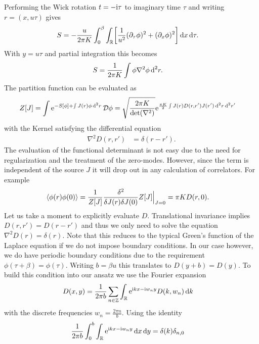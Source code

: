 \documentclass[english, parskip=full]{scrartcl}
\begin{document}
Performing the Wick rotation $t=-\i\tau$ to imaginary time $\tau$ and writing $r=(x,u\tau)$ gives
\begin{align}
S &= -\frac{u}{2\pi K} \intx{0}{\beta}{\intr{\klb*{\frac{1}{u^2} (\partial_\tau\phi)^2 + (\partial_x\phi)^2 }}{x} }{\tau}.
\end{align}
With $y=u\tau$ and partial integration this becomes
\begin{align}
S &= \frac{1}{2\pi K} \int \phi \nabla^2 \phi\,\d^2r.
\end{align}
The partition function can be evaluated as
\begin{align}
Z[J] &= \int \powe{-S[\phi] + \int J(r)\phi\,\d^2r}\,\mathcal{D}\phi = \sqrt{\frac{2\pi K}{\det (\nabla^2)}} \powe{\frac{\pi K}{2} \int J(r) D(r,r') J(r')\,\d^2r \,\d^2r'}
\end{align}
with the Kernel satisfying the differential equation
\begin{align}
\nabla^2 D(r,r') &= \delta(r-r').
\end{align}
The evaluation of the functional determinant is not easy due to the need for regularization and the treatment of the zero-modes.
However, since the term is independent of the source $J$ it will drop out in any calculation of correlators.
For example
\begin{align}
\bra*{\phi(r)\phi(0)} &= \frac{1}{Z[J]} \frac{\delta^2}{\delta J(r) \delta J(0)} Z[J] \Big\vert_{J=0} = \pi K D(r,0).
\end{align}
Let us take a moment to explicitly evaluate $D$.
Translational invariance implies $D(r,r')= D(r-r')$ and thus we only need to solve the equation $\nabla^2D(r) = \delta(r)$.
Note that this reduces to the typical Green's function of the Laplace equation if we do not impose boundary conditions.
In our case however, we do have periodic boundary conditions due to the requirement $\phi(\tau+\beta) = \phi(\tau)$.
Writing $b=\beta u$ this translates to $D(y+b)=D(y)$.
To build this condition into our ansatz we use the Fourier expansion
\begin{align}
D(x,y) &= \frac{1}{2\pi b} \sum_{n\in\mathbb{Z}} \intr{\powe{\i kx - \i w_n y} D(k,w_n)}{k}
\end{align}
with the discrete frequencies $w_n = \frac{2\pi n}{b}$.
Using the identity
\begin{align}
\frac{1}{2\pi b} \intx{0}{b}{\intr{\powe{\i kx - \i w_n y}}{x} }{y} &= \delta(k) \delta_{n,0}
\end{align}
\end{document}
